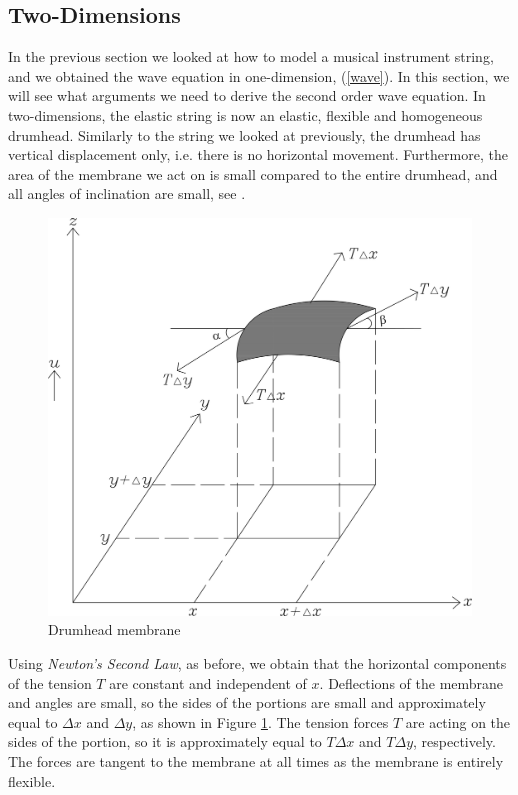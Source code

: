 \documentclass[a4paper, 12pt]{article}
\numberwithin{equation}{section}
\begin{document}
\subsection{Two-Dimensions} \label{twodim}
In the previous section we looked at how to model a musical instrument string,
and we obtained the wave equation in one-dimension, (\ref{wave}). In this
section, we will see what arguments we need to derive the second order wave
equation. In two-dimensions, the elastic string is now an elastic, flexible and
homogeneous drumhead. Similarly to the string we looked at previously, the
drumhead has vertical displacement only, i.e. there is no horizontal movement.
Furthermore, the area of the membrane we act on is small compared to the entire
drumhead, and all angles of inclination are small, see \cite{Kr}.

\begin{figure}[h]
    \centering
    \includegraphics[scale=0.5]{images/grafic-5} 
    \caption{Drumhead membrane}
    \label{fig:2}
\end{figure}

Using \emph{Newton's Second Law}, as before, we obtain that the horizontal
components of the tension $T$ are constant and independent of $x$. Deflections
of the membrane and angles are small, so the sides of the portions are small and
approximately equal to $\Delta x$ and $\Delta y$, as shown in Figure
\ref{fig:2}. The tension forces $T$ are acting on the sides of the portion, so
it is approximately equal to $T\Delta x$ and $T\Delta y$, respectively. The
forces are tangent to the membrane at all times as the membrane is entirely
flexible. \\
\end{document}
